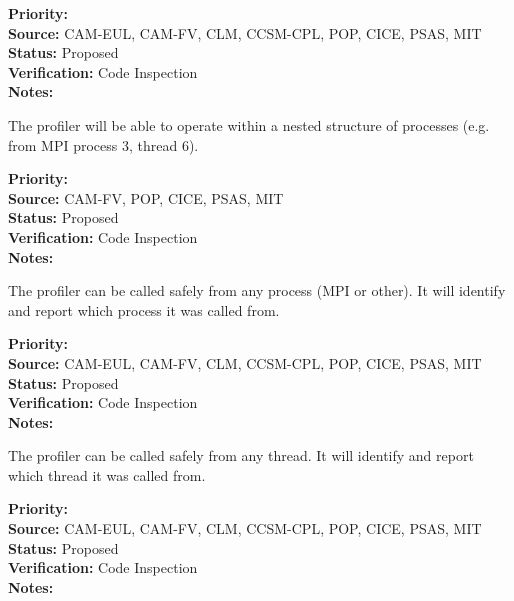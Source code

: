 \begin{reqlist}
{\bf Priority:}  \\
{\bf Source:} CAM-EUL, CAM-FV, CLM, CCSM-CPL, POP, CICE, PSAS, MIT \\
{\bf Status:} Proposed \\
{\bf Verification:} Code Inspection \\
{\bf Notes:} 
\end{reqlist}


The profiler will be able to operate within a nested structure of processes (e.g.
from MPI process 3, thread 6).

\begin{reqlist}
{\bf Priority:}  \\
{\bf Source:}  CAM-FV, POP, CICE, PSAS, MIT \\
{\bf Status:} Proposed \\
{\bf Verification:} Code Inspection \\
{\bf Notes:} 
\end{reqlist}


The profiler can be called safely from any process (MPI or other).  It will 
identify and report which process it was called from.

\begin{reqlist}
{\bf Priority:}  \\
{\bf Source:} CAM-EUL, CAM-FV, CLM, CCSM-CPL, POP, CICE, PSAS, MIT \\
{\bf Status:} Proposed \\
{\bf Verification:} Code Inspection \\
{\bf Notes:} 
\end{reqlist}


The profiler can be called safely from any thread.  It will 
identify and report which thread it was called from.

\begin{reqlist}
{\bf Priority:}  \\
{\bf Source:} CAM-EUL, CAM-FV, CLM, CCSM-CPL, POP, CICE, PSAS, MIT \\
{\bf Status:} Proposed \\
{\bf Verification:} Code Inspection \\
{\bf Notes:} 
\end{reqlist}


